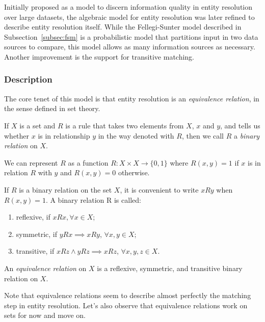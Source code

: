 
Initially proposed as a model to discern information quality in entity
resolution over large datasets\cite{tal2007algebraic}, the algebraic model
for entity resolution was later refined to describe entity resolution
itself\cite{Tal11}.
While the Fellegi-Sunter model described in Subsection~\ref{subsec:fsm} is a
probabilistic model that partitions input in two data sources to compare,
this model allows as many information sources as necessary.
Another improvement is the support for transitive matching.

\subsubsection[algdesc]{Description}\label{subsubsec:algdesc}

The core tenet of this model is that entity resolution is an \textit{
equivalence relation}, in the sense defined in set theory.

\begin{defn} If $X$ is a set and $R$ is a rule that takes two elements from
$X$, $x$ and $y$, and tells us whether $x$ is in relationship $y$ in the way
denoted with $R$, then we call $R$ a \textit{binary relation} on
$X$\cite{hoffman1971linear}.
\end{defn}

We can represent $R$ as a function $R:X \times X \rightarrow \{0,1\}$ where
$R(x,y)=1$ if $x$ is in relation $R$ with $y$ and $R(x,y)=0$ otherwise.

\begin{defn}If $R$ is a binary relation on the set $X$, it is convenient to
write $xRy$ when $R(x, y) = 1$.
A binary relation R is called:

\begin{enumerate}
    \item reflexive, if $xRx, \forall x \in X$;
    \item symmetric, if $yRx \implies xRy$, $\forall x,y \in X$;
    \item transitive, if $xRz \land yRz \implies xRz$, $\forall x,y,z \in X$.
\end{enumerate}

An \textit{equivalence relation} on $X$ is a reflexive, symmetric, and
transitive binary relation on $X$\cite{hoffman1971linear}.
\end{defn}

Note that equivalence relations seem to describe almost perfectly the
matching step in entity resolution.
Let's also observe that equivalence relations work on sets for now and move
on.

